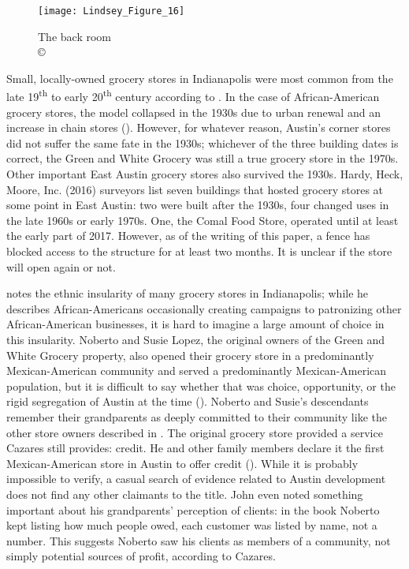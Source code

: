 \begin{figure}[!tb]
	\texttt{[image: Lindsey\_Figure\_16]}
	\caption{The back room\\
		{\normalfont\scriptsize \copyright\
			\shortauthor
	}}
	\label{fig:Lindsey_Figure_16}
\end{figure}


Small, locally-owned grocery stores in Indianapolis were most common from the late 19\textsuperscript{th} to early 20\textsuperscript{th} century according to \textcite{mullins}. In the case of African-American grocery stores, the model collapsed in the 1930s due to urban renewal and an increase in chain stores (\cite[88]{mullins}). However, for whatever reason, Austin’s corner stores did not suffer the same fate in the 1930s; whichever of the three building dates is correct, the Green and White Grocery was still a true grocery store in the 1970s. Other important East Austin grocery stores also survived the 1930s. Hardy, Heck, Moore, Inc. (2016) surveyors list seven buildings that hosted grocery stores at some point in East Austin: two were built after the 1930s, four changed uses in the late 1960s or early 1970s. One, the Comal Food Store, operated until at least the early part of 2017. However, as of the writing of this paper, a fence has blocked access to the structure for at least two months. It is unclear if the store will open again or not.


\textcite{mullins} notes the ethnic insularity of many grocery stores in Indianapolis; while he describes African-Americans occasionally creating campaigns to patronizing other African-American businesses, it is hard to imagine a large amount of choice in this insularity. Noberto and Susie Lopez, the original owners of the Green and White Grocery property, also opened their grocery store in a predominantly Mexican-American community and served a predominantly Mexican-American population, but it is difficult to say whether that was choice, opportunity, or the rigid segregation of Austin at the time (\cite{hernandez}).
Noberto and Susie's descendants remember their grandparents as deeply committed to their community like the other store owners described in \textcite{mullins}. The original grocery store provided a service Cazares still provides: credit. He and other family members declare it the first Mexican-American store in Austin to offer credit (\cite{lepe}). While it is probably impossible to verify, a casual search of evidence related to Austin development does not find any other claimants to the title. John even noted something important about his grandparents' perception of clients: in the book Noberto kept listing how much people owed, each customer was listed by name, not a number. This suggests Noberto saw his clients as members of a community, not simply potential sources of profit, according to Cazares.


